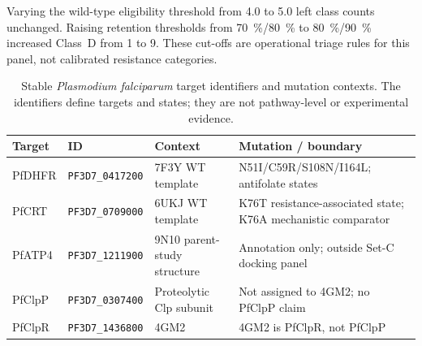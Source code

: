 \documentclass[11pt,a4paper]{article}
\begin{document}




\noindent Varying the wild-type eligibility threshold from \qty{4.0}{\kcalmol} to \qty{5.0}{\kcalmol} left class counts unchanged. Raising retention thresholds from \qty{70}{\percent}/\qty{80}{\percent} to \qty{80}{\percent}/\qty{90}{\percent} increased Class~D from 1 to 9. These cut-offs are operational triage rules for this panel, not calibrated resistance categories.













\begin{table}[htbp]
\centering
\scriptsize
\setlength{\tabcolsep}{0pt}
\caption{Stable \textit{Plasmodium falciparum} target identifiers and mutation contexts. The identifiers define targets and states; they are not pathway-level or experimental evidence.}
\label{tab:s5_plasmodb}
\begin{tabularx}{\textwidth}{>{\raggedright\arraybackslash}p{} >{\raggedright\arraybackslash}p{} >{\raggedright\arraybackslash}p{} X}
\toprule
Target & ID & Context & Mutation / boundary \\
\midrule
PfDHFR & \scriptsize\texttt{PF3D7\_0417200}\normalsize & 7F3Y WT template & N51I/C59R/S108N/I164L; antifolate states \\
PfCRT & \scriptsize\texttt{PF3D7\_0709000}\normalsize & 6UKJ WT template & K76T resistance-associated state; K76A mechanistic comparator \\
PfATP4 & \scriptsize\texttt{PF3D7\_1211900}\normalsize & 9N10 parent-study structure & Annotation only; outside Set-C docking panel \\
PfClpP & \scriptsize\texttt{PF3D7\_0307400}\normalsize & Proteolytic Clp subunit & Not assigned to 4GM2; no PfClpP claim \\
PfClpR & \scriptsize\texttt{PF3D7\_1436800}\normalsize & 4GM2 & 4GM2 is PfClpR, not PfClpP \\
\bottomrule
\end{tabularx}
\normalsize
\setlength{\tabcolsep}{6pt}
\end{table}
\end{document}
